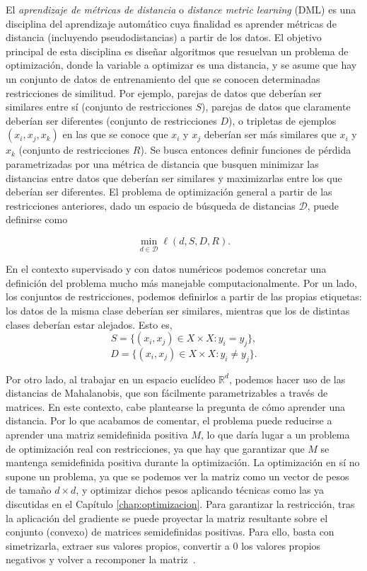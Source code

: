 El \emph{aprendizaje de métricas de distancia} o \emph{distance metric learning} (DML) es una disciplina del aprendizaje automático cuya finalidad es aprender métricas de distancia (incluyendo pseudodistancias) a partir de los datos. El objetivo principal de esta disciplina es diseñar algoritmos que resuelvan un problema de optimización, donde la variable a optimizar es una distancia, y se asume que hay un conjunto de datos de entrenamiento del que se conocen determinadas restricciones de similitud. Por ejemplo, parejas de datos que deberían ser similares entre sí (conjunto de restricciones $S$), parejas de datos que claramente deberían ser diferentes (conjunto de restricciones $D$), o tripletas de ejemplos $(x_i, x_j,x_k)$ en las que se conoce que $x_i$ y $x_j$ deberían ser más similares que $x_i$ y $x_k$ (conjunto de restricciones $R$). Se busca entonces definir funciones de pérdida parametrizadas por una métrica de distancia que busquen minimizar las distancias entre datos que deberían ser similares y maximizarlas entre los que deberían ser diferentes. El problema de optimización general a partir de las restricciones anteriores, dado un espacio de búsqueda de distancias $\mathcal{D}$, puede definirse como

\[\min_{d\in\mathcal{D}} \ell(d,S,D,R).\]

En el contexto supervisado y con datos numéricos podemos concretar una definición del problema mucho más manejable computacionalmente. Por un lado, los conjuntos de restricciones, podemos definirlos a partir de las propias etiquetas: los datos de la misma clase deberían ser similares, mientras que los de distintas clases deberían estar alejados. Esto es,
\[ S = \{(x_i, x_j) \in X \times X \colon y_i = y_j\},\]
\[ D = \{(x_i, x_j) \in X \times X \colon y_i \ne y_j\}.\]

Por otro lado, al trabajar en un espacio euclídeo $\mathbb{R}^d$, podemos hacer uso de las distancias de Mahalanobis, que son fácilmente parametrizables a través de matrices. En este contexto, cabe plantearse la pregunta de cómo aprender una distancia. Por lo que acabamos de comentar, el problema puede reducirse a aprender una matriz semidefinida positiva $M$, lo que daría lugar a un problema de optimización real con restricciones, ya que hay que garantizar que $M$ se mantenga semidefinida positiva durante la optimización. La optimización en sí no supone un problema, ya que se podemos ver la matriz como un vector de pesos de tamaño $d\times d$, y optimizar dichos pesos aplicando técnicas como las ya discutidas en el Capítulo \ref{chap:optimizacion}. Para garantizar la restricción, tras la aplicación del gradiente se puede proyectar la matriz resultante sobre el conjunto (convexo) de matrices semidefinidas positivas. Para ello, basta con simetrizarla, extraer sus valores propios, convertir a 0 los valores propios negativos y volver a recomponer la matriz~\parencite{higham1988computing}.


